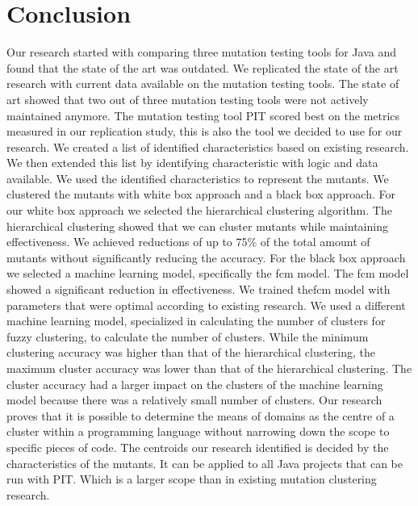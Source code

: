 \documentclass[../main]{subfiles}
\begin{document}
\chapter{Conclusion}
\label{ch:conclusion}
Our research started with comparing three mutation testing tools for Java and found that the state of the art was outdated.
We replicated the state of the art research with current data available on the mutation testing tools.
The state of art showed that two out of three mutation testing tools were not actively maintained anymore.
The mutation testing tool PIT scored best on the metrics measured in our replication study, this is also the tool we decided to use for our research.
\newline
We created a list of identified characteristics based on existing research. 
We then extended this list by identifying characteristic with logic and data available.
We used the identified characteristics to represent the mutants.
\newline
We clustered the mutants with white box approach and a black box approach.
For our white box approach we selected the hierarchical clustering algorithm.
The hierarchical clustering showed that we can cluster mutants while maintaining effectiveness.
We achieved reductions of up to 75\% of the total amount of mutants without significantly reducing the accuracy.
\newline
For the black box approach we selected a machine learning model, specifically the \acrlong{fcm} model.
The \acrshort{fcm} model showed a significant reduction in effectiveness.
We trained the\acrshort{fcm} model with parameters that were optimal according to existing research. 
We used a different machine learning model, specialized in calculating the number of clusters for fuzzy clustering, to calculate the number of clusters.
While the minimum clustering accuracy was higher than that of the hierarchical clustering, the maximum cluster accuracy was lower than that of the hierarchical clustering.
The cluster accuracy had a larger impact on the clusters of the machine learning model because there was a relatively small number of clusters.
Our research proves that it is possible to determine the means of domains as the centre of a cluster within a programming language without narrowing down the scope to specific pieces of code.
The centroids our research identified is decided by the characteristics of the mutants.
It can be applied to all Java projects that can be run with PIT. 
Which is a larger scope than in existing mutation clustering research.
\end{document}
